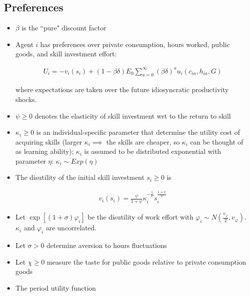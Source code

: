 \documentclass{article}
\begin{document}
\subsection{Preferences}

\begin{itemize}

\item $\beta$ is the ``pure" discount factor

\item Agent $i$ has preferences over private consumption, hours worked, public goods, and skill investment effort:

\begin{align}
U_i = - v_i(s_i) + (1 - \beta \delta) E_0 \sum_{a = 0}^\infty (\beta \delta)^a u_i(c_{ia}, h_{ia}, G) \label{utility}
\end{align}

where expectations are taken over the future idiosyncratic productivity shocks.

\item $\psi \ge 0$ denotes the elasticity of skill investment wrt to the return to skill

\item $\kappa_i \ge 0$ is an individual-specific parameter that determine the utility cost of acquiring skills (larger $\kappa_i \implies$ the skills are cheaper, so $\kappa_i$ can be thought of as learning ability); $\kappa_i$ is assumed to be distributed exponential with parameter $\eta$: $\kappa_i \sim Exp(\eta)$

\item The disutility of the initial skill investment $s_i \ge 0$ is

\begin{align}
v_i(s_i) = \frac{\psi}{1 + \psi} \kappa_i^{-\frac{1}{\psi}} s_i^\frac{1 + \psi}{\psi} \label{disutility_skill}
\end{align}

\item Let $\exp[(1+\sigma) \varphi_i]$ be the disutility of work effort with $\varphi_i \sim N(\frac{v_\varphi}{2}, v_\varphi)$. $\kappa_i$ and $\varphi_i$ are uncorrelated.

\item Let $\sigma > 0$ determine aversion to hours fluctuations

\item Let $\chi \ge 0$ measure the taste for public goods relative to private consumption goods

\item The period utility function


\end{itemize}
\end{document}
